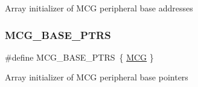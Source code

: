 Array initializer of M\+CG peripheral base addresses \mbox{\label{group___m_c_g___peripheral___access___layer_ga3e6aec328b7327acc1f7bff70bec388c}} 
\subsubsection{\texorpdfstring{MCG\_BASE\_PTRS}{MCG\_BASE\_PTRS}}
{\footnotesize\ttfamily \#define M\+C\+G\+\_\+\+B\+A\+S\+E\+\_\+\+P\+T\+RS~\{ \mbox{\hyperlink{group___m_c_g___peripheral___access___layer_gad7ea2d93cafdbe9298ef1dd52be44f88}{M\+CG}} \}}

Array initializer of M\+CG peripheral base pointers 